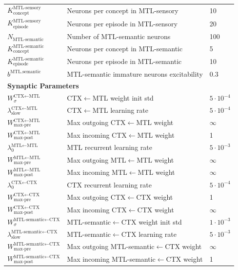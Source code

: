 \documentclass{article}
\begin{document}
\begin{table}[ht]
\begin{tabular}{lp{6cm}l}
$K^\textrm{MTL-sensory}_\textrm{concept}$ & Neurons per concept in MTL-sensory & 10 \\
$K^\textrm{MTL-sensory}_\textrm{episode}$ & Neurons per episode in MTL-sensory & 20 \\
$N_{\text{MTL-semantic}}$ & Number of MTL-semantic neurons & 100 \\
$K^\textrm{MTL-semantic}_\textrm{concept}$ & Neurons per concept in MTL-semantic & 5 \\
$K^\textrm{MTL-semantic}_\textrm{episode}$ & Neurons per episode in MTL-semantic & 10 \\
$b^\text{MTL.semantic}$ & MTL-semantic immature neurons excitability & 0.3 \\
\midrule
\multicolumn{3}{l}{\textbf{Synaptic Parameters}} \\
\midrule
$W_\sigma^{\text{CTX}\leftarrow\text{MTL}}$ & CTX$\leftarrow$MTL weight init std &$5\cdot 10^{-4}$ \\
$\lambda^{\text{CTX}\leftarrow\text{MTL}}_{\textrm{slow}}$ & CTX$\leftarrow$MTL learning rate & $5\cdot 10^{-4}$ \\
$W^{\text{CTX}\leftarrow\text{MTL}}_{\text{max-pre}}$ & Max outgoing CTX$\leftarrow$MTL weight & $\infty$ \\
$W^{\text{CTX}\leftarrow\text{MTL}}_{\text{max-post}}$ & Max incoming CTX$\leftarrow$MTL weight & 1 \\
$\lambda^{\text{MTL}\leftarrow\text{MTL}}_0$ & MTL recurrent learning rate & $5\cdot 10^{-3}$ \\
$W^{\text{MTL}\leftarrow\text{MTL}}_{\text{max-pre}}$ & Max outgoing MTL$\leftarrow$MTL weight & $\infty$ \\
$W^{\text{MTL}\leftarrow\text{MTL}}_{\text{max-post}}$ & Max incoming MTL$\leftarrow$MTL weight & $\infty$ \\
$\lambda^{\text{CTX}\leftarrow\text{CTX}}_0$ & CTX recurrent learning rate & $5\cdot 10^{-4}$ \\
$W^{\text{CTX}\leftarrow\text{CTX}}_{\text{max-pre}}$ & Max outgoing CTX$\leftarrow$CTX weight & 1 \\
$W^{\text{CTX}\leftarrow\text{CTX}}_{\text{max-post}}$ & Max incoming CTX$\leftarrow$CTX weight & $\infty$ \\
$W_\sigma^{\text{MTL-semantic}\leftarrow\text{CTX}}$ & MTL-semantic$\leftarrow$CTX weight init std & $1\cdot 10^{-3}$ \\
$\lambda^{\text{MTL-semantic}\leftarrow\text{CTX}}_{\textrm{slow}}$ & MTL-semantic$\leftarrow$CTX learning rate & $5\cdot 10^{-3}$ \\
$W^{\text{MTL-semantic}\leftarrow\text{CTX}}_{\text{max-pre}}$ & Max outgoing MTL-semantic$\leftarrow$CTX weight & $\infty$ \\
$W^{\text{MTL-semantic}\leftarrow\text{CTX}}_{\text{max-post}}$ & Max incoming MTL-semantic$\leftarrow$CTX weight & 1 \\
\bottomrule
\end{tabular}
\end{table}
\end{document}
